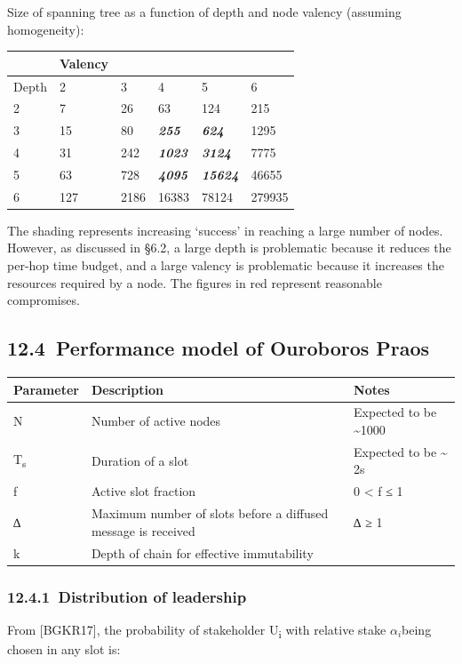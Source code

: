 \documentclass[11pt,a4paper]{article}
\begin{document}
Size of spanning tree as a function of depth and node valency (assuming
homogeneity):

\begin{longtable}[]{@{}llllll@{}}
\toprule
& Valency & & & &\tabularnewline
\midrule
\endhead
Depth & 2 & 3 & 4 & 5 & 6\tabularnewline
2 & 7 & 26 & 63 & 124 & 215\tabularnewline
3 & 15 & 80 & \emph{\textbf{255}} & \emph{\textbf{624}} &
1295\tabularnewline
4 & 31 & 242 & \emph{\textbf{1023}} & \emph{\textbf{3124}} &
7775\tabularnewline
5 & 63 & 728 & \emph{\textbf{4095}} & \emph{\textbf{15624}} &
46655\tabularnewline
6 & 127 & 2186 & 16383 & 78124 & 279935\tabularnewline
\bottomrule
\end{longtable}

The shading represents increasing `success' in reaching a large number
of nodes. However, as discussed in §6.2, a large depth is problematic
because it reduces the per-hop time budget, and a large valency is
problematic because it increases the resources required by a node. The
figures in red represent reasonable compromises.

\hypertarget{performance-model-of-ouroboros-praos}{%
\subsection{​12.4​~Performance model of Ouroboros
Praos}\label{performance-model-of-ouroboros-praos}}

\begin{longtable}[]{@{}lll@{}}
\toprule
\textbf{Parameter} & \textbf{Description} &
\textbf{Notes}\tabularnewline
\midrule
\endhead
N & Number of active nodes & Expected to be
\textasciitilde{}1000\tabularnewline
T\textsubscript{s} & Duration of a slot & Expected to be
\textasciitilde{} 2s\tabularnewline
f & Active slot fraction & 0 \textless{} f ≤ 1\tabularnewline
∆ & Maximum number of slots before a diffused message is received & ∆ ≥
1\tabularnewline
k & Depth of chain for effective immutability &\tabularnewline
\bottomrule
\end{longtable}

\hypertarget{distribution-of-leadership}{%
\subsubsection{​12.4.1​~Distribution of
leadership}\label{distribution-of-leadership}}

From {[}BGKR17{]}, the probability of stakeholder U\textsubscript{i}
with relative stake \(\alpha_{i}\)being chosen in any slot is:
\end{document}
